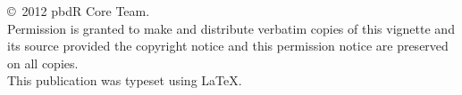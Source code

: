 
\null
\vfill
\copyright\ 2012 pbdR Core Team.\\

Permission is granted to make and distribute verbatim copies of
this vignette and its source provided the copyright notice and
this permission notice are preserved on all copies.\\

This publication was typeset using \LaTeX.
